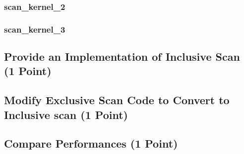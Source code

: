 \subsubsection*{scan\_kernel\_2}

\subsubsection*{scan\_kernel\_3}
\pagebreak
\subsection{Provide an Implementation of Inclusive Scan (1 Point)}


\pagebreak
\subsection{Modify Exclusive Scan Code to Convert to Inclusive scan (1 Point)}


\pagebreak
\subsection{Compare Performances (1 Point)}


\pagebreak